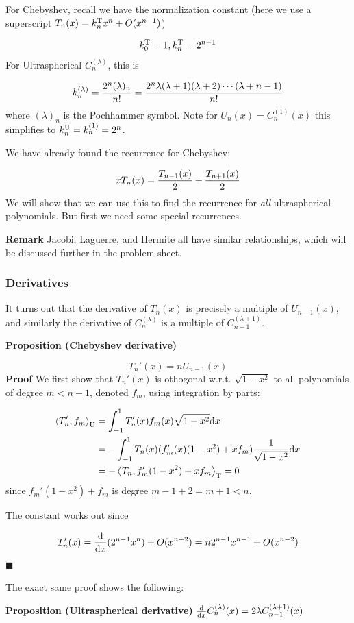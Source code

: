 \documentclass[12pt,a4paper]{article}
\def\D{ {\rm d} }
\def\addtab#1={#1\;&=}
\def\ccr{\\\addtab}
\def\ip<#1>{\left\langle{#1}\right\rangle}
\def\dx{\D x}
\def\addtab#1={#1\;&=}
\def\ccr{\\\addtab}
\begin{document}
For Chebyshev, recall we have the normalization constant (here we use a superscript $T_n(x) = k_n^{\rm T} x^n + O(x^{n-1})$)

\[
k_0^{\rm T} = 1, k_n^{\rm T} = 2^{n-1}
\]
For Ultraspherical $C_n^{(\lambda)}$, this is

\[
k_n^{(\lambda)} = {2^n (\lambda)_n \over n!} = {2^n \lambda (\lambda+1) (\lambda+2) \cdots (\lambda+n-1)  \over n!}
\]
where $(\lambda)_n$ is the Pochhammer symbol. Note for $U_n(x) = C_n^{(1)}(x)$ this simplifies to $k_n^{\rm U} = k_n^{(1)} = 2^n$.

We have  already found the recurrence for Chebyshev:

\[
x T_n(x) = {T_{n-1}(x) \over 2} +  {T_{n+1}(x) \over 2}
\]
We will show that we can use this to find the recurrence for \emph{all} ultraspherical polynomials. But first we need some special recurrences.

\textbf{Remark} Jacobi, Laguerre, and Hermite all have similar relationships, which will be discussed further in the problem sheet.

\subsubsection{Derivatives}
It turns out that the derivative of $T_n(x)$ is precisely a multiple of  $U_{n-1}(x)$, and similarly the derivative of $C_n^{(\lambda)}$ is a multiple of $C_{n-1}^{(\lambda+1)}$.

\textbf{Proposition (Chebyshev derivative)} 

\[
T_n'(x) = n U_{n-1}(x)
\]
\textbf{Proof}  We first show that $T_n'(x)$ is othogonal w.r.t. $\sqrt{1-x^2}$ to all  polynomials of degree $m < n-1$, denoted $f_m$, using integration by parts:


\begin{align*}
\ip<T_n',f_m>_{\rm U} &= \int_{-1}^1 T_n'(x) f_m(x) \sqrt{1-x^2} \dx \ccr
= -\int_{-1}^1 T_n(x) (f_m'(x)(1-x^2) + xf_m) {1  \over \sqrt{1-x^2}} \dx  \ccr
= - \ip<T_n, f_m'(1-x^2) + x f_m >_{\rm T}  = 0
\end{align*}
since $f_m'(1-x^2) + f_m $ is degree $m-1 +2 = m+1 < n$.

The constant works out since

\[
T_n'(x) = {\D \over \dx} (2^{n-1} x^n)  + O(x^{n-2}) = n 2^{n-1} x^{n-1} + O(x^{n-2})
\]
\ensuremath{\blacksquare}

The exact same proof shows the following:

\textbf{Proposition (Ultraspherical derivative)}  ${\D \over \dx} C_n^{(\lambda)}(x) = 2 \lambda  C_{n-1}^{(\lambda+1)}(x)$
\end{document}
